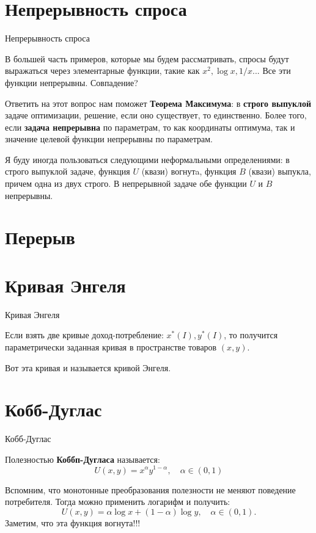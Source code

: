 \documentclass{beamer}
\begin{document}
\section{Непрерывность спроса}

\begin{frame}{Непрерывность спроса}

В большей часть примеров, которые мы будем рассматривать, спросы будут выражаться через элементарные функции, такие как $x^2, \log x, 1/x$... Все эти функции непрерывны. Совпадение?

Ответить на этот вопрос нам поможет \textbf{Теорема Максимума}: в \textbf{строго выпуклой} задаче оптимизации, решение, если оно существует, то единственно. Более того, если \textbf{задача непрерывна} по параметрам, то как координаты оптимума, так и значение целевой функции непрерывны по параметрам.

Я буду иногда пользоваться следующими неформальными определениями: в строго выпуклой задаче, функция $U$ (квази) вогнутa, функция $B$ (квази) выпукла, причем одна из двух строго. В непрерывной задаче обе функции $U$ и $B$ непрерывны.

\end{frame}

\section{Перерыв}

\section{Кривая Энгеля}

\begin{frame}{Кривая Энгеля}

Если взять две кривые доход-потребление: $x^{\ast}(I), y^{\ast}(I)$, то получится параметрически заданная кривая в пространстве товаров $(x,y)$. 

Вот эта кривая и называется кривой Энгеля.

\end{frame}

\section{Кобб-Дуглас}

\begin{frame}{Кобб-Дуглас}

\begin{definition}
Полезностью \textbf{Коббп-Дугласа} называется:
$$U(x, y) = x^{\alpha} y^{1-\alpha}, \quad \alpha \in (0,1)$$  
\end{definition}

Вспомним, что монотонные преобразования полезности не меняют поведение потребителя. Тогда можно применить логарифм и получить:
$$ U(x, y) = \alpha \log x + (1-\alpha) \log y, \quad \alpha \in (0,1).$$ 
Заметим, что эта функция вогнута!!! 
\end{frame}
\end{document}
